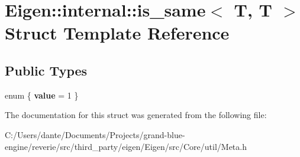 \hypertarget{struct_eigen_1_1internal_1_1is__same_3_01_t_00_01_t_01_4}{}\section{Eigen\+::internal\+::is\+\_\+same$<$ T, T $>$ Struct Template Reference}
\label{struct_eigen_1_1internal_1_1is__same_3_01_t_00_01_t_01_4}
\subsection*{Public Types}
\begin{DoxyCompactItemize}
\item 
\mbox{\label{struct_eigen_1_1internal_1_1is__same_3_01_t_00_01_t_01_4_ad7d0bdd393cf69895f431ca3663a2199}} 
enum \{ {\bfseries value} = 1
 \}
\end{DoxyCompactItemize}


The documentation for this struct was generated from the following file\+:\begin{DoxyCompactItemize}
\item 
C\+:/\+Users/dante/\+Documents/\+Projects/grand-\/blue-\/engine/reverie/src/third\+\_\+party/eigen/\+Eigen/src/\+Core/util/Meta.\+h\end{DoxyCompactItemize}
